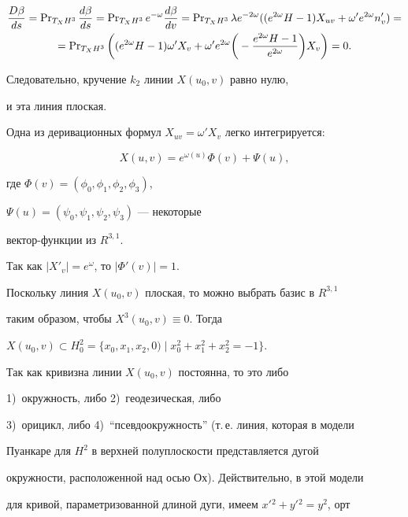 \begin{pf}
\begin{multline*}


\frac{D \beta}{ds}=\PR_{T_XH^3}\frac{d \beta}{ds}=\PR_{T_XH^3}e^{- \omega}


\frac{d \beta}{dv}=


\PR_{T_XH^3} \lambda e^{-2 \omega}((e^{2 \omega}H-1)X_{uv}+\omega '


e^{2 \omega}n'_v)=\\


=\PR_{T_XH^3}\bigg((e^{2\omega}H-1)\omega 'X_v+\omega 'e^{2\omega}


\bigg(-\frac{e^{2\omega}H-1}{e^{2\omega}}\bigg)X_v\bigg)=0.


\end{multline*}


Следовательно, кручение $k_2$ линии $X(u_0,v)$ равно нулю,


и эта линия плоская.





Одна из деривационных формул $X_{uv}=\omega 'X_v$ легко интегрируется:


$$


X(u,v)=e^{\omega (u)} \Phi (v)+ \Psi (u),


$$


где $\Phi (v)=(\phi_0,\phi_1,\phi_2,\phi_3)$,


$\Psi(u)=(\psi_0,\psi_1,\psi_2,\psi_3)$ --- некоторые


вектор-функции из $R^{3,1}$.


Так как $|X'_v|=e^{\omega}$, то $| \Phi '(v)|=1$.


Поскольку линия $X(u_0,v)$ плоская, то можно выбрать базис в $R^{3,1}$


таким образом, чтобы $X^3(u_0,v) \equiv 0$. Тогда


$X(u_0,v) \subset H^2_0=\{x_0,x_1,x_2,0) \mid x_0^2+x_1^2+x_2^2=-1\}$.


Так как кривизна линии $X(u_0,v)$ постоянна, то это либо


1)~окружность, либо 2)~геодезическая, либо


3)~орицикл, либо 4)~``псевдоокружность'' (т.\,е. линия, которая в модели


Пуанкаре для $H^2$ в верхней полуплоскости представляется дугой


окружности, расположенной над осью $Ох$). Действительно, в этой модели


для кривой, параметризованной длиной дуги, имеем $x'{}^2+y'{}^2=y^2$, орт



\end{pf}
